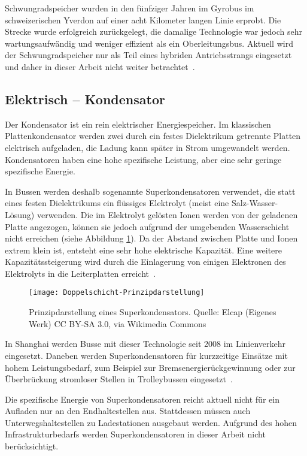 Schwungradspeicher wurden in den fünfziger Jahren im Gyrobus im schweizerischen Yverdon auf einer acht Kilometer langen Linie erprobt. Die Strecke wurde erfolgreich zurückgelegt, die damalige Technologie war jedoch sehr wartungsaufwändig und weniger effizient als ein Oberleitungsbus. Aktuell wird der Schwungradspeicher nur als Teil eines hybriden Antriebsstrangs eingesetzt und daher in dieser Arbeit nicht weiter betrachtet~\cite[S. 216]{tub_aleph001746639}.

\subsection{Elektrisch – Kondensator}
Der Kondensator ist ein rein elektrischer Energiespeicher. Im klassischen Plattenkondensator werden zwei durch ein festes Dielektrikum getrennte Platten elektrisch aufgeladen, die Ladung kann später in Strom umgewandelt werden. Kondensatoren haben eine hohe spezifische Leistung, aber eine sehr geringe spezifische Energie.

In Bussen werden deshalb sogenannte Superkondensatoren verwendet, die statt eines festen Dielektrikums ein flüssiges Elektrolyt (meist eine Salz-Wasser-Lösung) verwenden. Die im Elektrolyt gelösten Ionen werden von der geladenen Platte angezogen, können sie jedoch aufgrund der umgebenden Wasserschicht nicht erreichen (siehe Abbildung \ref{abb_doppelschicht}). Da der Abstand zwischen Platte und Ionen extrem klein ist, entsteht eine sehr hohe elektrische Kapazität. Eine weitere Kapazitätssteigerung wird durch die Einlagerung von einigen Elektronen des Elektrolyts in die Leiterplatten erreicht~\cite[S. 167f]{Sterner:2014}.

\begin{figure}\centering
	\texttt{[image: Doppelschicht-Prinzipdarstellung]}
	\caption[Prinzipdarstellung eines Superkondensators]{Prinzipdarstellung eines Superkondensators. Quelle: Elcap (Eigenes Werk) CC BY-SA 3.0, via Wikimedia Commons}
	\label{abb_doppelschicht}
\end{figure}

In Shanghai werden Busse mit dieser Technologie seit 2008 im Linienverkehr eingesetzt. Daneben werden Superkondensatoren für kurzzeitige Einsätze mit hohem Leistungsbedarf, zum Beispiel zur Bremsenergierückgewinnung oder zur Überbrückung stromloser Stellen in Trolleybussen eingesetzt~\cite{Barminer-Busgesellschaft:2012}.

Die spezifische Energie von Superkondensatoren reicht aktuell nicht für ein Aufladen nur an den Endhaltestellen aus. Stattdessen müssen auch Unterwegshaltestellen zu Ladestationen ausgebaut werden. Aufgrund des hohen Infrastrukturbedarfs werden Superkondensatoren in dieser Arbeit nicht berücksichtigt.

